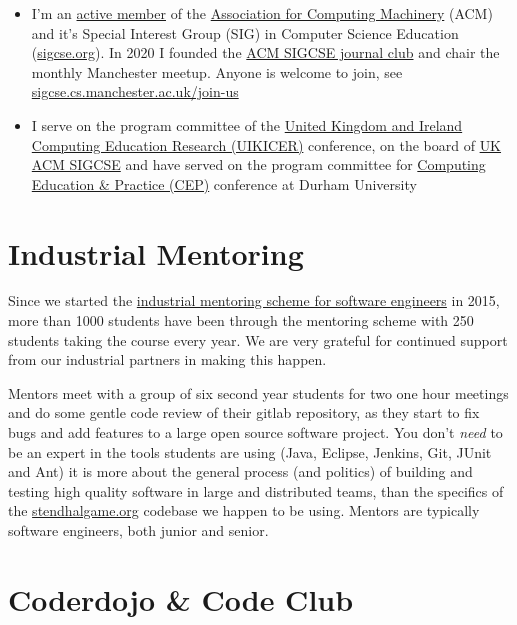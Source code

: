 \documentclass[
  12pt,
]{book}
\providecommand{\tightlist}{%
  \setlength{\itemsep}{0pt}\setlength{\parskip}{0pt}}
\begin{document}
\begin{itemize}
\tightlist
\item
  I'm an \href{https://dl.acm.org/profile/81350580198}{active member} of the \href{https://en.wikipedia.org/wiki/Association_for_Computing_Machinery}{Association for Computing Machinery} (ACM) and it's Special Interest Group (SIG) in Computer Science Education (\href{https://sigcse.org}{sigcse.org}). In 2020 I founded the \href{https://sigcse.cs.manchester.ac.uk/}{ACM SIGCSE journal club} and chair the monthly Manchester meetup. Anyone is welcome to join, see \href{https://sigcse.cs.manchester.ac.uk/join-us}{sigcse.cs.manchester.ac.uk/join-us}
\item
  I serve on the program committee of the \href{https://www.ukicer.com/}{United Kingdom and Ireland Computing Education Research (UIKICER)} conference, on the board of \href{https://uki-sigcse.acm.org/about}{UK ACM SIGCSE} and have served on the program committee for \href{http://community.dur.ac.uk/cep.conference}{Computing Education \& Practice (CEP)} conference at Durham University
\end{itemize}

\hypertarget{industrial-mentoring}{%
\section{Industrial Mentoring}\label{industrial-mentoring}}

Since we started the \href{https://www.cs.manchester.ac.uk/connect/business-engagement/industrial-mentoring/}{industrial mentoring scheme for software engineers} in 2015, more than 1000 students have been through the mentoring scheme with 250 students taking the course every year. We are very grateful for continued support from our industrial partners in making this happen.

Mentors meet with a group of six second year students for two one hour meetings and do some gentle code review of their gitlab repository, as they start to fix bugs and add features to a large open source software project. You don't \emph{need} to be an expert in the tools students are using (Java, Eclipse, Jenkins, Git, JUnit and Ant) it is more about the general process (and politics) of building and testing high quality software in large and distributed teams, than the specifics of the \href{https://stendhalgame.org/}{stendhalgame.org} codebase we happen to be using. Mentors are typically software engineers, both junior and senior.

\hypertarget{codeclub}{%
\section{Coderdojo \& Code Club}\label{codeclub}}
\end{document}
